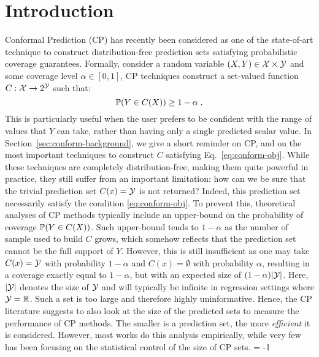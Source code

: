 
\section{Introduction}

Conformal Prediction (CP) \citep{vovk2005algorithmic} has recently been considered as one of the state-of-art technique to construct distribution-free prediction sets satisfying probabilistic coverage guarantees. Formally, consider a random variable $(X,Y)\in{\cal X} \times {\cal Y}$ and some coverage level $\alpha\in[0,1]$, CP techniques construct a set-valued function $C:{\cal X} \rightarrow 2^{\cal Y}$ such that: 
%
\begin{equation}
    \label{eq:conform-obj}
    {\mathbb{P}}(Y\in C(X)) \geq 1-\alpha\;.
\end{equation}
%
This is particularly useful when the user prefers to be confident with the range of values that $Y$ can take, rather than having only a single predicted scalar value. In Section~\ref{sec:conform-background}, we give a short reminder on CP, and on the most important techniques to construct $C$ satisfying Eq.~\eqref{eq:conform-obj}. While these techniques are completely distribution-free, making them quite powerful in practice, they still suffer from an important limitation: how can we be sure that the trivial prediction set $C(x) = {\cal Y}$ is not returned? Indeed, this prediction set necessarily satisfy the condition \eqref{eq:conform-obj}. To prevent this, theoretical analyses of CP methods typically include an upper-bound on the probability of coverage ${\mathbb{P}}(Y\in C(X))$. Such upper-bound tends to $1-\alpha$ as the number of sample used to build $C$ grows, which somehow reflects that the prediction set cannot be the full support of $Y$. However, this is still insufficient as one may take $C(x) = {\cal Y}$ with probability $1-\alpha$ and $C(x) = \emptyset$ with probability $\alpha$, resulting in a coverage exactly equal to $1-\alpha$, but with an expected size of $(1-\alpha)|{\cal Y}|$. Here, $|{\cal Y}|$ denotes the size of ${\cal Y}$ and will typically be infinite in regression settings where ${\cal Y}={\mathbb{R}}$. Such a set is too large and therefore highly uninformative. Hence, the CP literature suggests to also look at the size of the predicted sets to measure the performance of CP methods. The smaller is a prediction set, the more \textit{efficient} it is considered. However, most works do this analysis empirically, while very few has been focusing on the statistical control of the size of CP sets. \looseness = -1

